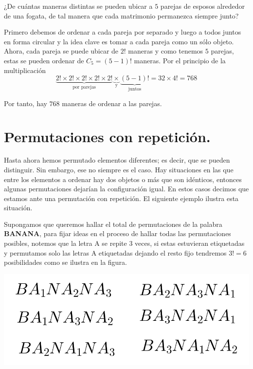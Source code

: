 \begin{ejemplo}
    ¿De cuántas maneras distintas se pueden ubicar a $5$ parejas de esposos alrededor de una fogata, de tal manera que cada matrimonio permanezca siempre junto?
\end{ejemplo}

\begin{solucion}
Primero debemos de ordenar a cada pareja por separado y luego a todos juntos en forma circular y la idea clave es tomar a cada pareja como un sólo objeto. Ahora, cada pareja se puede ubicar de $2!$ maneras y como tenemos $5$ parejas, estas se pueden ordenar de $C_5=(5-1)!$ maneras. Por el principio de la multiplicación
\[\underbrace{2!\times 2!\times 2!\times 2!\times 2!}_{\text{por parejas}}\underbrace{\times}_{\text{y}}\underbrace{(5-1)!}_{\text{juntos}}=32\times 4!=768\]
\end{solucion}
Por tanto, hay $768$ maneras de ordenar a las parejas.


\section{Permutaciones con repetición.}
Hasta ahora hemos permutado elementos diferentes; es decir, que se pueden distinguir. Sin embargo, ese no siempre es el caso. Hay situaciones en las que entre los elementos a ordenar hay dos objetos o más que son idénticos, entonces algunas permutaciones dejarían la configuración igual. En estos casos decimos que estamos ante una permutación con repetición. El siguiente ejemplo ilustra esta situación.

\begin{ejemplo}
Supongamos que queremos hallar el total de permutaciones de la palabra \textbf{BANANA}, para fijar ideas en el proceso de hallar todas las permutaciones posibles, notemos que la letra A se repite 3 veces, si estas estuvieran etiquetadas y permutamos solo las letras A etiquetadas dejando el resto fijo tendremos $3!=6$ posibilidades como se ilustra en la figura.
\end{ejemplo}
\begin{center}
    \includegraphics[scale=0.25]{Imagenes/IMG5/S1-5-03.png}
\end{center}

